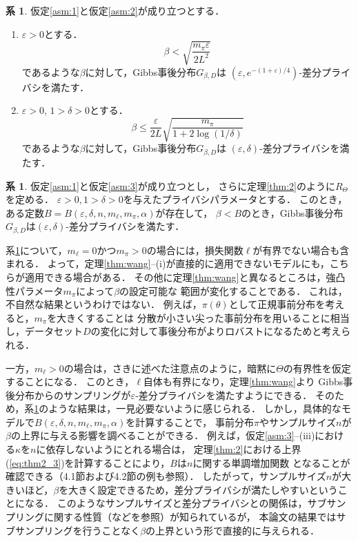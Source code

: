 \documentclass{jarticle}
\theoremstyle{definition}
\newtheorem{cor}[thm]{系}
\begin{document}
\begin{cor}
\label{cor:1}
仮定\ref{asm:1}と仮定\ref{asm:2}が成り立つとする．
\begin{enumerate}
\renewcommand{\labelenumi}{(\roman{enumi})}
\item $\varepsilon>0$とする．
\begin{equation}
\beta < \sqrt{\frac{m_\pi \varepsilon}{2 L^2}}
\end{equation}
であるような$\beta$に対して，Gibbs事後分布$G_{\beta, D}$は
$(\varepsilon, e^{-(1+\varepsilon)/4})$-差分プライバシを満たす．
\item $\varepsilon>0$, $1 > \delta > 0$とする．
\begin{equation}
\beta \leq 
\frac{\varepsilon}{2L}
\sqrt{\frac{m_\pi}{1 + 2\log(1/\delta)}}
\label{eq:beta_condition_2}
\end{equation}
であるような$\beta$に対して，Gibbs事後分布$G_{\beta, D}$は
$(\varepsilon, \delta)$-差分プライバシを満たす．
\end{enumerate}
\end{cor}

\begin{cor}
\label{cor:2}
仮定\ref{asm:1}と仮定\ref{asm:3}が成り立つとし，
さらに定理\ref{thm:2}のように$R_\Theta$を定める．
$\varepsilon >0, 1>\delta > 0$を与えたプライバシパラメータとする．
このとき，ある定数$B=B(\varepsilon, \delta, n, m_\ell, m_\pi, \alpha)$が存在して，
$\beta < B$のとき，Gibbs事後分布$G_{\beta, D}$は$(\varepsilon, \delta)$-差分プライバシを満たす．
\end{cor}


系\ref{cor:1}について，$m_\ell=0$かつ$m_\pi>0$の場合には，損失関数$\ell$が有界でない場合も含まれる．
よって，定理\ref{thm:wang}--(i)が直接的に適用できないモデルにも，こちらが適用できる場合がある．
その他に定理\ref{thm:wang}と異なるところは，強凸性パラメータ$m_\pi$によって$\beta$の設定可能な
範囲が変化することである．
これは，不自然な結果というわけではない．
例えば，$\pi(\theta)$として正規事前分布を考えると，$m_\pi$を大きくすることは
分散が小さい尖った事前分布を用いることに相当し，データセット$D$の変化に対して事後分布がよりロバストになるためと考えられる．

一方，$m_\ell>0$の場合は，さきに述べた注意点のように，暗黙に$\Theta$の有界性を仮定することになる．
このとき，$\ell$自体も有界になり，定理\ref{thm:wang}より
Gibbs事後分布からのサンプリングが$\varepsilon$-差分プライバシを満たすようにできる．
そのため，系\ref{cor:2}のような結果は，一見必要ないように感じられる．
しかし，具体的なモデルで$B(\varepsilon, \delta, n, m_\ell, m_\pi, \alpha)$を計算することで，
事前分布$\pi$やサンプルサイズ$n$が$\beta$の上界に与える影響を調べることができる．
例えば，仮定\ref{asm:3}--(iii)における$\kappa$を$n$に依存しないようにとれる場合は，
定理\ref{thm:2}における上界(\ref{eq:thm2_3})を計算することにより，$B$は$n$に関する単調増加関数
となることが確認できる（4.1節および4.2節の例も参照）．
したがって，サンプルサイズ$n$が大きいほど，$\beta$を大きく設定できるため，差分プライバシが満たしやすいということになる．
このようなサンプルサイズと差分プライバシとの関係は，サブサンプリングに関する性質（\cite{Li2012}などを参照）が知られているが，
本論文の結果ではサブサンプリングを行うことなく$\beta$の上界という形で直接的に与えられる．
\end{document}
